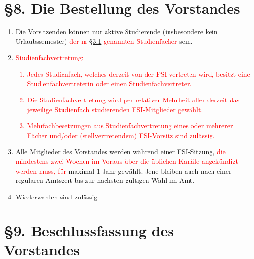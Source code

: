 \documentclass[a4paper,12pt]{article}
\newcommand{\red}[1]{\textcolor{red}{#1}}
\begin{document}
\section*{§8. Die Bestellung des Vorstandes}

\begin{enumerate}
	\item
		Die Vorsitzenden können nur aktive Studierende (insbesondere
		kein Urlaubssemester) \red{der in \hyperref[3.1]{§3.1} genannten Studienfächer} sein.
	\item
		\red{
		Studienfachvertretung:
		\begin{enumerate}[label=(\roman*)]
			\item 
			Jedes Studienfach, welches derzeit von der FSI vertreten wird, besitzt eine Studienfachvertreterin oder einen Studienfachvertreter.
			\item 
			Die Studienfachvertretung wird per relativer Mehrheit aller derzeit das jeweilige Studienfach studierenden FSI-Mitglieder gewählt.
			\item 
			Mehrfachbesetzungen aus Studienfachvertretung eines oder mehrerer Fächer und/oder (stellvertretendem) FSI-Vorsitz sind zulässig.			
		\end{enumerate}}
	\item
		Alle Mitglieder des Vorstandes werden während einer
		FSI-Sitzung, \red{die mindestens zwei Wochen im Voraus über die üblichen Kanäle 
		angekündigt werden muss,} \red{für} maximal 1 Jahr gewählt. Jene bleiben
		auch nach einer regulären Amtszeit bis zur nächsten gültigen
		Wahl im Amt.
	\item
		Wiederwahlen sind zulässig.
\end{enumerate}

\section*{§9. Beschlussfassung des Vorstandes}
\end{document}
